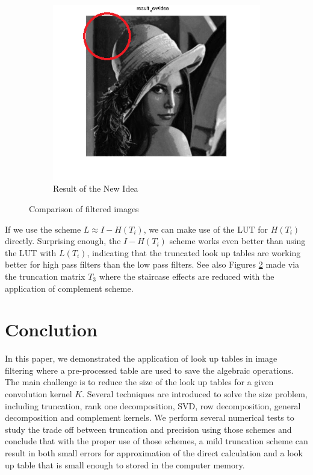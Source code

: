 \documentclass[12pt]{amsart}
\theoremstyle{definition}
\theoremstyle{remark}
\numberwithin{thm}{section}
\begin{document}
\begin{figure}[h]
\begin{subfigure}[b]{0.3\textwidth} \includegraphics[width=\textwidth]{new.png} \caption{Result of the New Idea} \label{fig:new} \end{subfigure}
\caption{Comparison of filtered images}\label{fig:comp} 
\end{figure}

If we use the scheme $L\approx I-H(T_i)$, we can make use of the LUT for $H(T_i)$ directly. Surprising enough, the $I-H(T_i)$ scheme works even better than using the LUT with $L(T_i)$, indicating that the truncated look up tables are working better for high pass filters than the low pass filters. See also Figures \ref{fig:comp} made via the truncation matrix $T_3$ where the staircase effects are reduced with the application of complement scheme. 

\section{Conclution}
In this paper, we demonstrated the application of look up tables in image filtering where a pre-processed table are used to save the algebraic operations. The main challenge is to reduce the size of the look up tables for a given convolution kernel $K$. Several techniques are introduced to solve the size problem, including truncation, rank one decomposition, SVD, row decomposition, general decomposition and complement kernels. We perform several numerical tests to study the trade off between truncation and precision using those schemes and conclude that with the proper use of those schemes, a mild truncation scheme can result in both small errors for approximation of the direct calculation and a look up table that is small enough to stored in the computer memory. 
\end{document}
